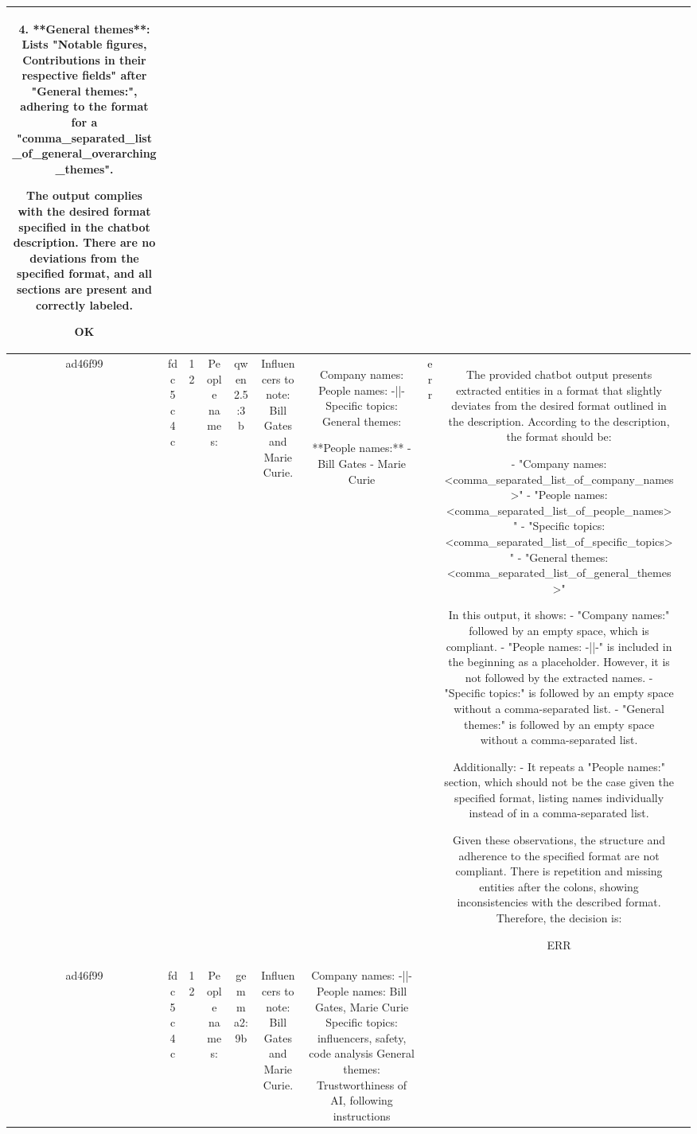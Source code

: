 \begin{table}[h!]
\begin{tabular}{|c|c|c|c|c|c|c|c|c|c|}
4. **General themes**: Lists "Notable figures, Contributions in their respective fields" after "General themes:", adhering to the format for a "comma_separated_list_of_general_overarching_themes".

The output complies with the desired format specified in the chatbot description. There are no deviations from the specified format, and all sections are present and correctly labeled.

OK & \\
\hline
ad46f99 & fdc5c4c & 12 & People names: & qwen2.5:3b & Influencers to note: Bill Gates and Marie Curie. & Company names: 
People names: -||-
Specific topics: 
General themes: 

**People names:**  
- Bill Gates  
- Marie Curie & err & The provided chatbot output presents extracted entities in a format that slightly deviates from the desired format outlined in the description. According to the description, the format should be:

- "Company names: <comma_separated_list_of_company_names>"
- "People names: <comma_separated_list_of_people_names>"
- "Specific topics: <comma_separated_list_of_specific_topics>"
- "General themes: <comma_separated_list_of_general_themes>"

In this output, it shows:
- "Company names:" followed by an empty space, which is compliant.
- "People names: -||-" is included in the beginning as a placeholder. However, it is not followed by the extracted names.
- "Specific topics:" is followed by an empty space without a comma-separated list.
- "General themes:" is followed by an empty space without a comma-separated list.

Additionally:
- It repeats a "People names:" section, which should not be the case given the specified format, listing names individually instead of in a comma-separated list.

Given these observations, the structure and adherence to the specified format are not compliant. There is repetition and missing entities after the colons, showing inconsistencies with the described format. Therefore, the decision is:

ERR & \\
\hline
ad46f99 & fdc5c4c & 12 & People names: & gemma2:9b & Influencers to note: Bill Gates and Marie Curie. & Company names:  -||-
People names: Bill Gates, Marie Curie
Specific topics: influencers, safety, code analysis 
General themes: Trustworthiness of AI, following instructions



\end{tabular}
\end{table}
